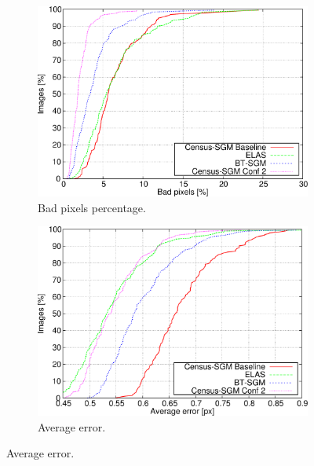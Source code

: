\begin{figure}
  \centering
  \begin{subfigure}[h]{\textwidth}
    \centering
    \includegraphics[width=\textwidth, trim=0 0 0 0,clip]{algo_bpp_ee3}
    \caption{ Bad pixels percentage. }
    \label{fig:cp03_algorithms_LGT_bpp}
  \end{subfigure}%

  \begin{subfigure}[h]{\textwidth}
    \centering
    \includegraphics[width=\textwidth, trim=0 0 0 0, clip]{algo_avg_ee3}
    \caption{ Average error. }
    \label{fig:cp03_algorithms_LGT_avg}
  \end{subfigure}%
\end{figure}


